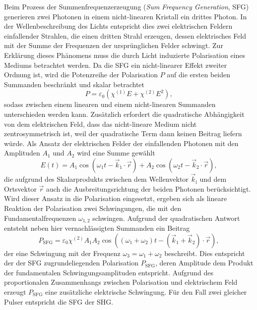         Beim Prozess der Summenfrequenzerzeugung (\textit{Sum Frequency Generation}, SFG) generieren zwei Photonen in einem nicht-linearen Kristall ein drittes Photon. In der Wellenbeschreibung des Lichts 
        entspricht dies zwei elektrischen Feldern einfallender Strahlen, die einen dritten Strahl erzeugen, dessen elektrisches Feld mit der Summe der Frequenzen der ursprünglichen Felder schwingt. Zur 
        Erklärung dieses Phänomens muss die durch Licht induzierte Polarisation eines Mediums betrachtet werden. Da die SFG ein nicht-linearer Effekt zweiter Ordnung ist, wird die Potenzreihe der Polarisation 
        $P$ auf die ersten beiden Summanden beschränkt und skalar betrachtet
        \begin{equation*}
            P = \varepsilon_0 \left( \chi^{\left( 1 \right)}  E + \chi^{\left( 2 \right)}  E^2 \right) ,
        \end{equation*}
        sodass zwischen einem linearen und einem nicht-linearen Summanden unterschieden werden kann. Zusätzlich erfordert die quadratische Abhängigkeit von dem elektrischen Feld, dass das nicht-lineare Medium 
        nicht zentrosymmetrisch ist, weil der quadratische Term dann keinen Beitrag liefern würde. Als Ansatz der elektrischen Felder der einfallenden Photonen mit den Amplituden $A_1$ und $A_2$ wird eine 
        Summe gewählt
        \begin{equation*}
            E(t) = A_1  \cos\left(\omega_1 t - \vec{k}_1 \cdot \vec{r}\right) + A_2  \cos\left(\omega_2 t - \vec{k}_2 \cdot \vec{r}\right),
        \end{equation*}
        die aufgrund des Skalarprodukts zwischen dem Wellenvektor $\vec{k}_{\text{i}}$ und dem Ortsvektor $\vec{r}$ auch die Ausbreitungsrichtung der beiden Photonen berücksichtigt. Wird dieser Ansatz in die 
        Polarisation eingesetzt, ergeben sich als lineare Reaktion der Polarisation zwei Schwingungen, die mit den Fundamentalfrequenzen $\omega_{1,2}$ schwingen. Aufgrund der quadratischen Antwort entsteht 
        neben hier vernachlässigten Summanden ein Beitrag 
        \begin{equation*}
            P_{\text{SFG}} = \varepsilon_0  \chi^{(2)}  A_1 A_2  \cos\left( \left(\omega_1 + \omega_2\right) t - \left( \vec{k}_1 + \vec{k}_2 \right) \cdot \vec{r} \right) ,
        \end{equation*}
        der eine Schwingung mit der Frequenz $\omega_3 = \omega_1 + \omega_2$ beschreibt. Dies entspricht der der SFG zugrundeliegenden Polarisation 
        $P_{\text{SFG}}$, deren Amplitude dem Produkt der fundamentalen Schwingungsamplituden entspricht. Aufgrund des proportionalen Zusammenhangs zwischen Polarisation und elektrischem Feld erzeugt 
        $P_{\text{SFG}}$ eine zusätzliche elektrische Schwingung. Für den Fall zwei gleicher Pulser entspricht die SFG der SHG.

